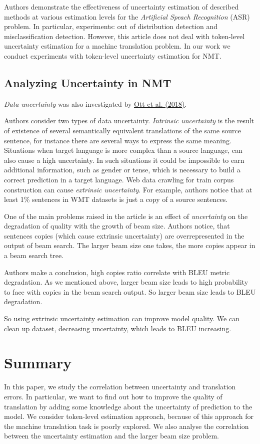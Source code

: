 \documentclass[a4paper,14pt]{extarticle}
\newcommand{\bibref}[3]{\hyperlink{#1}{#2 (#3)}}
\begin{document}
	Authors demonstrate the effectiveness of uncertainty estimation of described methods at various estimation levels for the  \textit{Artificial Speach Recognition} (ASR) problem. In particular, experiments: out of distribution detection and misclassification detection. However, this article does not deal with token-level uncertainty estimation for a machine translation problem. In our work we conduct experiments with token-level uncertainty estimation for NMT.
	
	\subsection{Analyzing Uncertainty in NMT}
	\textit{Data uncertainty} was also investigated by \bibref{anal_uncertainty}{Ott et al.}{2018}.
	
	Authors consider two types of data uncertainty. \textit{Intrinsic uncertainty} is the result of existence of several semantically equivalent translations of the same source sentence, for instance there are several ways to express the same meaning. Situations when target language is more complex than a source language, can also cause a high uncertainty. In such situations it could be impossible to earn additional information, such as gender or tense, which is necessary to build a correct prediction in a target language. Web data crawling for train corpus construction can cause \textit{extrinsic uncertainty}. For example, authors notice that at least 1\% sentences in WMT datasets is just a copy of a source sentences.
	
	One of the main problems raised in the article is an effect of \textit{uncertainty} on the degradation of quality with the growth of beam size. Authors notice, that sentences copies (which cause extrinsic uncertainty) are overrepresented in the output of beam search. The larger beam size one takes, the more copies appear in a beam search tree.
	
	Authors make a conclusion, high copies ratio correlate with BLEU metric degradation. As we mentioned above, larger beam size leads to high probability to face with copies in the beam search output. So larger beam size leads to BLEU degradation. 
	
	So using extrinsic uncertainty estimation can improve model quality. We can clean up dataset, decreasing uncertainty, which leads to BLEU increasing.
	
	\section{Summary}
	In this paper, we study the correlation between uncertainty and translation errors. In particular, we want to find out how to improve the quality of translation by adding some knowledge about the uncertainty of prediction to the model. We consider token-level estimation approach, because of this approach for the machine translation task is poorly explored. We also analyse the correlation between the uncertainty estimation and the larger beam size problem.
	
\end{document}
